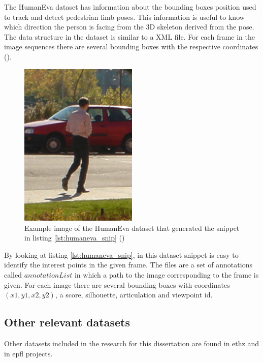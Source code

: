 The HumanEva dataset has information about the bounding boxes position used to track and detect pedestrian limb poses. This information is useful to know which direction the person is facing from the 3D skeleton derived from the pose. The data structure in the dataset is similar to a XML file. For each frame in the image sequences there are several bounding boxes with the respective coordinates (\cite{Sigal}).

\begin{figure}

\end{figure}

\begin{figure}[htp]
	
	\centering
	\includegraphics[width=0.5\textwidth]{capstate/imgs/00050.png}
	
	\caption{Example image of the HumanEva dataset that generated the snippet in listing \ref{lst:humaneva_snip} (\cite{Max-Planck-Gesellschaft}) }
	\label{fig:00050}
	
\end{figure}

By looking at listing \ref{lst:humaneva_snip}, in this dataset snippet is easy to identify the interest points in the given frame. The files are a set of annotations called $annotationList$ in which a path to the image corresponding to the frame is given. For each image there are several bounding boxes with coordinates $(x1,y1,x2,y2)$, a score, silhouette, articulation and viewpoint id.

\subsection{Other relevant datasets}
Other datasets included in the research for this dissertation are found in \gls{ethz} and in \gls{epfl} projects. 
